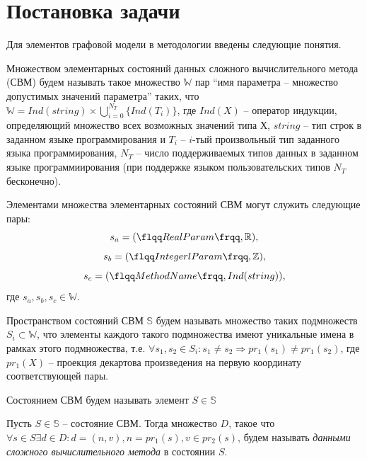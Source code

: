 \chapter{Постановка задачи}\label{chap1_taskStatement}
Для элементов графовой модели в методологии  введены следующие понятия.

\begin{definition}
    Множеством элементарных состояний данных сложного вычислительного метода (СВМ) будем называть такое множество \(\mathbb{W}\) пар ``имя параметра -- множество допустимых значений параметра'' таких, что \(\mathbb{W}=Ind(string)\times\bigcup_{i=0}^{N_T}\{Ind(T_i)\}\), где \(Ind(X)\) -- оператор индукции, определяющий множество всех возможных значений типа Х, \(string\) -- тип строк в заданном языке программирования и \(T_i\) -- \(i\)-тый произвольный тип заданного языка программирования, \(N_T\) -- число поддерживаемых типов данных в заданном языке программиирования (при поддержке языком пользовательских типов \(N_T\) бесконечно).
\end{definition}

Элементами множества элементарных состояний СВМ могут служить следующие пары:
$$s_a=(\flqq RealParam \frqq, \mathbb{R}),$$
$$s_b=(\flqq IntegerlParam \frqq, \mathbb{Z}),$$
$$s_c=(\flqq MethodName \frqq, Ind(string)),$$
где \(s_a, s_b, s_c \in \mathbb{W}\).

\begin{definition}
    Пространством состояний СВМ \(\mathbb{S}\) будем называть множество таких подмножеств \(S_i\subset\mathbb{W}\), что элементы каждого такого подмножества имеют уникальные имена в рамках этого подмножества, т.е. \(\forall s_1, s_2 \in S_i: s_1 \neq s_2 \Rightarrow pr_1(s_1) \neq pr_1(s_2)\), где \(pr_1(X)\) -- проекция декартова произведения на первую координату соответствующей пары.
\end{definition}

\begin{definition}
    Состоянием СВМ будем называть элемент \(S\in\mathbb{S}\)
\end{definition}

\begin{definition}
    \label{def:CCMData}
    Пусть \(S\in\mathbb{S}\) -- состояние СВМ. Тогда множество \(D\), такое что \(\forall s \in S \exists d \in D : d = (n,v), n = pr_1(s), v \in pr_2(s)\),
    будем называть \emph{данными сложного вычислительного метода} в состоянии $S$.
\end{definition}

